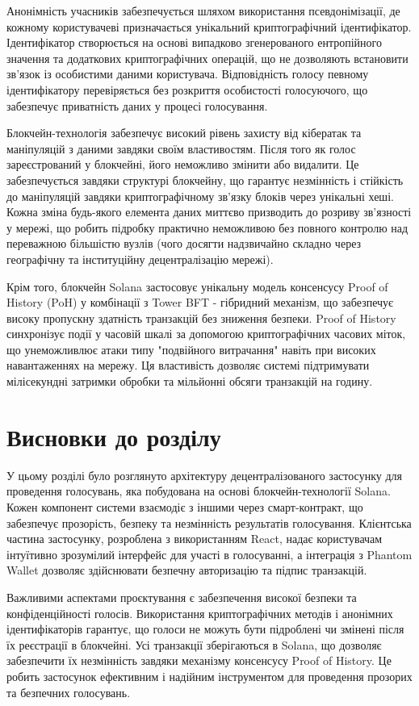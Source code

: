 \documentclass[14pt]{extreport}
\begin{document}
  Анонімність учасників забезпечується шляхом використання псевдонімізації, де кожному користувачеві призначається унікальний криптографічний ідентифікатор. Ідентифікатор створюється на основі випадково згенерованого ентропійного значення та додаткових криптографічних операцій, що не дозволяють встановити зв'язок із особистими даними користувача. Відповідність голосу певному ідентифікатору перевіряється без розкриття особистості голосуючого, що забезпечує приватність даних у процесі голосування.
  
  Блокчейн-технологія забезпечує високий рівень захисту від кібератак та маніпуляцій з даними завдяки своїм властивостям. Після того як голос зареєстрований у блокчейні, його неможливо змінити або видалити. Це забезпечується завдяки структурі блокчейну, що гарантує незмінність і стійкість до маніпуляцій завдяки криптографічному зв'язку блоків через унікальні хеші. Кожна зміна будь-якого елемента даних миттєво призводить до розриву зв'язності у мережі, що робить підробку практично неможливою без повного контролю над переважною більшістю вузлів (чого досягти надзвичайно складно через географічну та інституційну децентралізацію мережі).
  
  Крім того, блокчейн Solana застосовує унікальну модель консенсусу Proof of History (PoH) у комбінації з Tower BFT - гібридний механізм, що забезпечує високу пропускну здатність транзакцій без зниження безпеки. Proof of History синхронізує події у часовій шкалі за допомогою криптографічних часових міток, що унеможливлює атаки типу "подвійного витрачання" навіть при високих навантаженнях на мережу. Ця властивість дозволяє системі підтримувати мілісекундні затримки обробки та мільйонні обсяги транзакцій на годину.
  
  \section{Висновки до розділу}
  
  У цьому розділі було розглянуто архітектуру децентралізованого застосунку для проведення голосувань, яка побудована на основі блокчейн-технології Solana. Кожен компонент системи взаємодіє з іншими через смарт-контракт, що забезпечує прозорість, безпеку та незмінність результатів голосування. Клієнтська частина застосунку, розроблена з використанням React, надає користувачам інтуїтивно зрозумілий інтерфейс для участі в голосуванні, а інтеграція з Phantom Wallet дозволяє здійснювати безпечну авторизацію та підпис транзакцій.

  Важливими аспектами проєктування є забезпечення високої безпеки та конфіденційності голосів. Використання криптографічних методів і анонімних ідентифікаторів гарантує, що голоси не можуть бути підроблені чи змінені після їх реєстрації в блокчейні. Усі транзакції зберігаються в Solana, що дозволяє забезпечити їх незмінність завдяки механізму консенсусу Proof of History. Це робить застосунок ефективним і надійним інструментом для проведення прозорих та безпечних голосувань.
  
\end{document}
